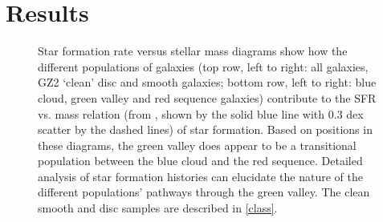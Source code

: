 \documentclass[useAMS,usenatbib]{mn2e}
\begin{document}
\section{Results}\label{results}
\begin{figure}
\caption{Star formation rate versus stellar mass diagrams show how the different populations of galaxies  (top row, left to right: all galaxies, GZ2 `clean' disc and smooth galaxies; bottom row, left to right: blue cloud, green valley and red sequence galaxies) contribute to the SFR vs. mass relation (from \citet{Peng}, shown by the solid blue line with 0.3 dex scatter by the dashed lines) of star formation. Based on positions in these diagrams, the green valley does appear to be a transitional population between the blue cloud and the red sequence. Detailed analysis of star formation histories can elucidate the nature of the different populations' pathways through the green valley. The clean smooth and disc samples are described in \ref{class}.}
\label{sfr_mass_sub}
\end{figure}
\end{document}
